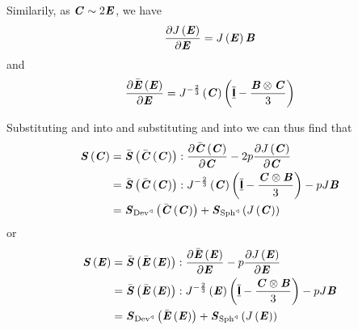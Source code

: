 Similarily, as $\boldsymbol{\mathit{C}}\sim 2\boldsymbol{\mathit{E}}$, we have
\begin{equation}
  \delby{\fnof{J}{\tensortwo{E}}}{\tensortwo{E}}=\fnof{J}{\tensortwo{E}}\tensortwo{B}
  \label{eqn:DelJacobianDelE}
\end{equation}
and
\begin{equation}
  \delby{\fnof{\bar{\tensortwo{E}}}{\tensortwo{E}}}{\tensortwo{E}}=
  \fnof{J^{-\frac{2}{3}}}{\tensortwo{C}}\pbrac{\symidentitytensorfour-\dfrac{\tensorprod{\tensortwo{B}}{\tensortwo{C}}}{3}}
  \label{eqn:DelEBarDelE}
\end{equation}

Substituting  and  into
 and substituting  and
 into  we can thus find that
\begin{equation}
  \begin{split}
    \fnof{\tensor{S}}{\tensor{C}}
    &=\doubledotprod{\fnof{\bar{\tensor{S}}}{\fnof{\bar{\tensortwo{C}}}{\tensortwo{C}}}}{\delby{\fnof{\bar{\tensor{C}}}{\tensortwo{C}}}{\tensor{C}}}-2p\delby{\fnof{J}{\tensortwo{C}}}{\tensor{C}}\\
    &=\doubledotprod{\fnof{\bar{\tensor{S}}}{\fnof{\bar{\tensortwo{C}}}{\tensortwo{C}}}}{\fnof{J^{-\frac{2}{3}}}{\tensortwo{C}}\pbrac{\symidentitytensorfour-\dfrac{\tensorprod{\tensor{C}}{\tensor{B}}}{3}}}-pJ\tensor{B}\\
    &=\fnof{\tensor{S}_{\pullback{\Devop}{}}}{\fnof{\bar{\tensortwo{C}}}{\tensortwo{C}}}
    +\fnof{\tensor{S}_{\pullback{\Sphop}{}}}{\fnof{J}{\tensortwo{C}}}
  \end{split}
  \label{eqn:FiniteElasticityDecomposedSecondPKinC}
\end{equation}
or
\begin{equation}
  \begin{split}
    \fnof{\tensor{S}}{\tensor{E}}
    &=\doubledotprod{\fnof{\bar{\tensor{S}}}{\fnof{\bar{\tensortwo{E}}}{\tensortwo{E}}}}{\delby{\fnof{\bar{\tensor{E}}}{\tensortwo{E}}}{\tensor{E}}}-p\delby{\fnof{J}{\tensortwo{E}}}{\tensor{E}}\\
    &=\doubledotprod{\fnof{\bar{\tensor{S}}}{\fnof{\bar{\tensortwo{E}}}{\tensortwo{E}}}}{\fnof{J^{-\frac{2}{3}}}{\tensortwo{E}}\pbrac{\symidentitytensorfour-\dfrac{\tensorprod{\tensor{C}}{\tensor{B}}}{3}}}-pJ\tensor{B}\\
    &=\fnof{\tensor{S}_{\pullback{\Devop}{}}}{\fnof{\bar{\tensortwo{E}}}{\tensortwo{E}}}
    +\fnof{\tensor{S}_{\pullback{\Sphop}{}}}{\fnof{J}{\tensortwo{E}}}
  \end{split}
  \label{eqn:FiniteElasticityDecomposedSecondPKinE}
\end{equation}

